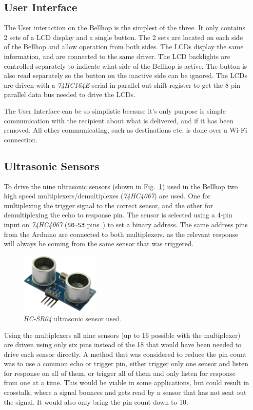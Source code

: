 \documentclass[11pt]{article}
\begin{document}
\subsection*{User Interface}


The User interaction on the Bellhop is the simplest of the three. It only contains 2 sets of a LCD display and a single button. The 2 sets are located on each side of the Bellhop and allow operation from both sides. The LCDs display the same information, and are connected to the same driver. The LCD backlights are controlled separately to indicate what side of the Bellhop is active. The button is also read separately so the button on the inactive side can be ignored. The LCDs are driven with a \textit{74HC164E} serial-in parallel-out shift register to get the 8 pin parallel data bus needed to drive the LCDs.


The User Interface can be so simplistic because it’s only purpose is simple communication with the recipient about what is delivered, and if it has been removed. All other communicating, such as destinations etc. is done over a Wi-Fi connection.
\subsection*{Ultrasonic Sensors}
To drive the nine ultrasonic sensors (shown in Fig.~\ref{hc-sr04}) used in the Bellhop two high speed multiplexers/demultiplexes (\textit{74HC4067}) are used.  One for multiplexing the trigger signal to the correct sensor, and the other for demultiplexing the echo to response pin. The sensor is selected using a 4-pin input on \textit{74HC4067} (\texttt{S0}--\texttt{S3} pins~\cite{multiplexer-datasheet}) to set a binary address. The same address pins from the Arduino are connected to both multiplexers, as the relevant response will always be coming from the same sensor that was triggered.

\begin{figure}
	\includegraphics[width=4cm]{hc-sr04.jpg}
	\caption{\textit{HC-SR04} ultrasonic sensor used.}
	\label{hc-sr04}
\end{figure}

Using the multiplexers all nine sensors (up to 16 possible with the multiplexer) are driven using only six pins instead of the 18 that would have been needed to drive each sensor directly. A method that was considered to reduce the pin count was to use a common echo or trigger pin, either trigger only one sensor and listen for response on all of them, or trigger all of them and  only listen for response from one at a time. This would be viable in some applications, but could result in crosstalk, where a signal bounces and gets read by a sensor that has not sent out the signal. It would also only bring the pin count down to 10.
\end{document}
